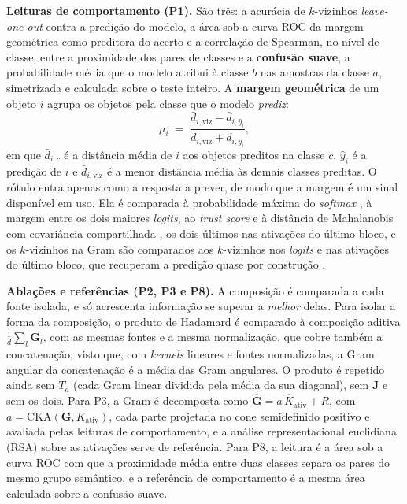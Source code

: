 \textbf{Leituras de comportamento (P1).} São três: a acurácia de $k$-vizinhos \textit{leave-one-out} contra a predição do modelo, a área sob a curva ROC da margem geométrica como preditora do acerto e a correlação de Spearman, no nível de classe, entre a proximidade dos pares de classes e a \textbf{confusão suave}, a probabilidade média que o modelo atribui à classe $b$ nas amostras da classe $a$, simetrizada e calculada sobre o teste inteiro. A \textbf{margem geométrica} de um objeto $i$ agrupa os objetos pela classe que o modelo \emph{prediz}:
\begin{equation}\label{eq:margem_geometrica}
    \mu_i \;=\; \frac{\bar d_{i,\mathrm{viz}} - \bar d_{i,\hat y_i}}{\bar d_{i,\mathrm{viz}} + \bar d_{i,\hat y_i}},
\end{equation}
em que $\bar d_{i,c}$ é a distância média de $i$ aos objetos preditos na classe $c$, $\hat y_i$ é a predição de $i$ e $\bar d_{i,\mathrm{viz}}$ é a menor distância média às demais classes preditas. O rótulo entra apenas como a resposta a prever, de modo que a margem é um sinal disponível em uso. Ela é comparada à probabilidade máxima do \textit{softmax} \citep{Hendrycks2017}, à margem entre os dois maiores \textit{logits}, ao \textit{trust score} \citep{Jiang2018} e à distância de Mahalanobis com covariância compartilhada \citep{Lee2018}, os dois últimos nas ativações do último bloco, e os $k$-vizinhos na Gram são comparados aos $k$-vizinhos nos \textit{logits} e nas ativações do último bloco, que recuperam a predição quase por construção \citep{Papyan2020}.

\textbf{Ablações e referências (P2, P3 e P8).} A composição é comparada a cada fonte isolada, e só acrescenta informação se superar a \emph{melhor} delas. Para isolar a forma da composição, o produto de Hadamard é comparado à composição aditiva $\frac{1}{d}\sum_l \mathbf{G}_l$, com as mesmas fontes e a mesma normalização, que cobre também a concatenação, visto que, com \textit{kernels} lineares e fontes normalizadas, a Gram angular da concatenação é a média das Gram angulares. O produto é repetido ainda sem $T_a$ (cada Gram linear dividida pela média da sua diagonal), sem $\mathbf{J}$ e sem os dois. Para P3, a Gram é decomposta como $\hat{\mathbf{G}} = a\,\hat{K}_{\mathrm{ativ}} + R$, com $a = \mathrm{CKA}(\mathbf{G}, K_{\mathrm{ativ}})$, cada parte projetada no cone semidefinido positivo e avaliada pelas leituras de comportamento, e a análise representacional euclidiana (RSA) sobre as ativações serve de referência. Para P8, a leitura é a área sob a curva ROC com que a proximidade média entre duas classes separa os pares do mesmo grupo semântico, e a referência de comportamento é a mesma área calculada sobre a confusão suave.

